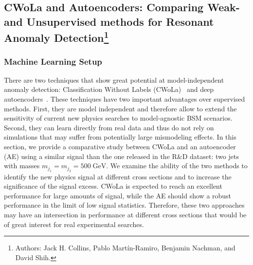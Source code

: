 \documentclass[a4paper,11pt]{article}
\begin{document}
 \FloatBarrier

\subsection[CWoLa and Autoencoders: Comparing Weak- and Unsupervised methods for Resonant Anomaly Detection]{CWoLa and Autoencoders: Comparing Weak- and Unsupervised methods for Resonant Anomaly Detection\footnote{Authors: Jack H. Collins, Pablo Mart\'in-Ramiro, Benjamin Nachman, and David Shih.}}

\label{sec:cwolaaecompare}

\subsubsection{Machine Learning Setup}
\label{sec:method}

There are two techniques that show great potential at model-independent anomaly detection: Classification Without Labels (CWoLa)~\cite{Metodiev:2017vrx, Collins:2018epr, Collins:2019jip} and deep autoencoders~\cite{Farina:2018fyg, Heimel:2018mkt, Cerri:2018anq, Roy:2019jae, Blance:2019ibf}. These techniques have two important advantages over supervised methods. First, they are model independent and therefore allow to extend the sensitivity of current new physics searches to model-agnostic BSM scenarios. Second, they can learn directly from real data and thus do not rely on simulations that may suffer from potentially large mismodeling effects. In this section, we provide a comparative study between CWoLa and an autoencoder (AE) using a similar signal than the one released in the R\&D dataset: two jets with masses $m_{j_{1}} = m_{j_{2}} = 500 \; \mathrm{GeV}$. We examine the ability of the two methods to identify the new physics signal at different cross sections and to increase the significance of the signal excess. CWoLa is expected to reach an excellent performance for large amounts of signal, while the AE should show a robust performance in the limit of low signal statistics. Therefore, these two approaches may have an intersection in performance at different cross sections that would be of great interest for real experimental searches.
\end{document}
